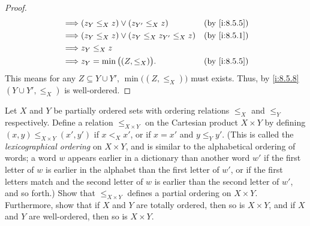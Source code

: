 \begin{proof}
\begin{align*}
    \implies & (z_Y \leq_X z) \lor (z_{Y'} \leq_X z)            &  & \by{i:8.5.5} \\
    \implies & (z_Y \leq_X z) \lor (z_Y \leq_X z_{Y'} \leq_X z) &  & \by{i:8.5.1} \\
    \implies & z_Y \leq_X z                                                       \\
    \implies & z_Y = \min\big((Z, \leq_X)\big).                 &  & \by{i:8.5.5}
  \end{align*}
  This means for any \(Z \subseteq Y \cup Y'\), \(\min\big((Z, \leq_X)\big)\) must exists.
  Thus, by \cref{i:8.5.8} \((Y \cup Y', \leq_X)\) is well-ordered.
\end{proof}

\begin{ex}\label{i:ex:8.5.12}
  Let \(X\) and \(Y\) be partially ordered sets with ordering relations \(\leq_X\) and \(\leq_Y\) respectively.
  Define a relation \(\leq_{X \times Y}\) on the Cartesian product \(X \times Y\) by defining \((x, y) \leq_{X \times Y} (x', y')\) if \(x <_X x'\), or if \(x = x'\) and \(y \leq_Y y'\).
  (This is called the \emph{lexicographical ordering} on \(X \times Y\), and is similar to the alphabetical ordering of words;
  a word \(w\) appears earlier in a dictionary than another word \(w'\) if the first letter of \(w\) is earlier in the alphabet than the first letter of \(w'\), or if the first letters match and the second letter of \(w\) is earlier than the second letter of \(w'\), and so forth.)
  Show that \(\leq_{X \times Y}\) defines a partial ordering on \(X \times Y\).
  Furthermore, show that if \(X\) and \(Y\) are totally ordered, then so is \(X \times Y\), and if \(X\) and \(Y\) are well-ordered, then so is \(X \times Y\).
\end{ex}

